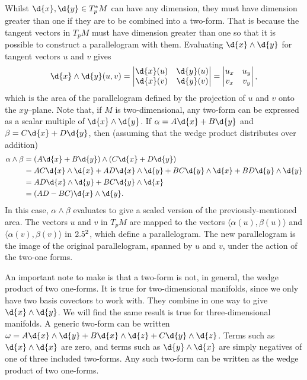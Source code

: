 \documentclass[a4paper,12pt]{article}
\begin{document}
Whilst $\d{x}, \d{y} \in T^*_p M$ can have any dimension, they must have dimension greater than one if they are to be combined into a two-form.
That is because the tangent vectors in $T_p M$ must have dimension greater than one so that it is possible to construct a parallelogram with them.
Evaluating $\d{x} \wedge \d{y}$ for tangent vectors $u$ and $v$ gives
\begin{equation*}
    \d{x} \wedge \d{y} (u, v) = \begin{vmatrix}
    \d{x}(u) & \d{y}(u) \\
    \d{x}(v) & \d{y}(v)
    \end{vmatrix}
    = \begin{vmatrix}
        u_x & u_y \\
        v_x & v_y
    \end{vmatrix},
\end{equation*}
which is the area of the parallelogram defined by the projection of $u$ and $v$ onto the $xy$--plane.
Note that, if $M$ is two-dimensional, any two-form can be expressed as a scalar multiple of $\d{x} \wedge \d{y}$.
If $\alpha = A\d{x} + B\d{y}$ and $\beta = C\d{x} + D\d{y}$, then (assuming that the wedge product distributes over addition)
\begin{align*}
    \alpha \wedge \beta &= (A\d{x} + B\d{y}) \wedge (C\d{x} + D\d{y}) \\
    &= AC \d{x} \wedge \d{x} + AD \d{x} \wedge \d{y} + BC \d{y} \wedge \d{x} + BD \d{y} \wedge \d{y} \\
    &= AD \d{x} \wedge \d{y} + BC \d{y} \wedge \d{x} \\
    &= (AD - BC) \d{x} \wedge \d{y}.
\end{align*}
In this case, $\alpha \wedge \beta$ evaluates to give a scaled version of the previously-mentioned area.
The vectors $u$ and $v$ in $T_p M$ are mapped to the vectors $\langle \alpha(u), \beta(u) \rangle$ and $\langle \alpha(v), \beta(v) \rangle$ in $2.5^2$, which define a parallelogram.
The new parallelogram is the image of the original parallelogram, spanned by $u$ and $v$, under the action of the two-one forms.

An important note to make is that a two-form is not, in general, the wedge product of two one-forms.
It is true for two-dimensional manifolds, since we only have two basis covectors to work with.
They combine in one way to give $\d{x} \wedge \d{y}$.
We will find the same result is true for three-dimensional manifolds.
A generic two-form can be written $\omega = A \d{x} \wedge \d{y} + B \d{x} \wedge \d{z} + C \d{y} \wedge \d{z}$.
Terms such as $\d{x} \wedge \d{x}$ are zero, and terms such as $\d{y} \wedge \d{x}$ are simply negatives of one of three included two-forms.
Any such two-form can be written as the wedge product of two one-forms.
\end{document}

